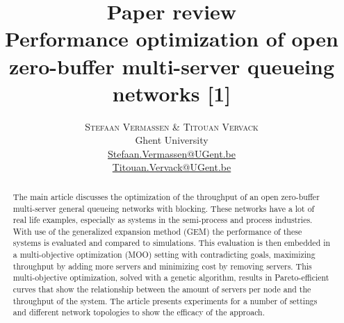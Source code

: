 \documentclass[twoside]{article}
\title{\vspace{-15mm}\fontsize{24pt}{10pt}\selectfont\textbf{Paper review \\ \large Performance optimization of open zero-buffer multi-server queueing networks \small[1]}} %
\author{
\large
\textsc{Stefaan Vermassen \& Titouan Vervack}\\[2mm] 
\normalsize Ghent University \\ 
\normalsize \href{mailto:Stefaan.Vermassen@UGent.be}{Stefaan.Vermassen@UGent.be} \\
\normalsize \href{mailto:Titouan.Vervack@UGent.be}{Titouan.Vervack@UGent.be} 
\vspace{-6mm}
}
\date{}
\begin{document}
\maketitle %

\thispagestyle{fancy} %


\begin{abstract}
\vspace{-4mm}
The main article discusses the optimization of the throughput of an open zero-buffer multi-server general queueing networks with blocking. These networks have a lot of real life examples, especially as systems in the semi-process and process industries. With use of the generalized expansion method (GEM) the performance of these systems is evaluated and compared to simulations. This evaluation is then embedded in a multi-objective optimization (MOO) setting with contradicting goals, maximizing throughput by adding more servers and minimizing cost by removing servers. This multi-objective optimization, solved with a genetic algorithm, results in Pareto-efficient curves that show the relationship between the amount of servers per node and the throughput of the system. The article presents experiments for a number of settings and different network topologies to show the efficacy of the approach.
\end{abstract}

\end{document}
